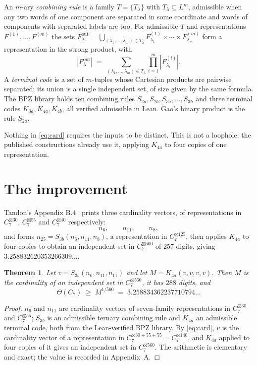 \documentclass[11pt]{article}
\newtheorem{theorem}{Theorem}
\theoremstyle{definition}
\begin{document}
An $m$-ary \emph{combining rule} is a family $T = \{T_\lambda\}$ with $T_\lambda \subseteq L^m$,
admissible when any two words of one component are separated in some coordinate and words of
components with separated labels are too. For admissible $T$ and representations
$F^{(1)}, \ldots, F^{(m)}$ the sets
$F^{\mathrm{out}}_\lambda = \bigcup_{(\lambda_1,\ldots,\lambda_m) \in T_\lambda}
 F^{(1)}_{\lambda_1} \times \cdots \times F^{(m)}_{\lambda_m}$
form a representation in the strong product, with
\begin{equation}\label{eq:card}
  |F^{\mathrm{out}}_\lambda| \;=\; \sum_{(\lambda_1,\ldots,\lambda_m) \in T_\lambda}
  \prod_{i=1}^m |F^{(i)}_{\lambda_i}|.
\end{equation}
A \emph{terminal code} is a set of $m$-tuples whose Cartesian products are pairwise separated; its
union is a single independent set, of size given by the same formula. The BPZ library holds ten
combining rules $S_{2a}, S_{2b}, S_{3a}, \ldots, S_{3h}$ and three terminal codes
$K_{3a}, K_{4a}, K_{4b}$, all verified admissible in Lean. Gao's binary product is the rule
$S_{2a}$.

Nothing in \eqref{eq:card} requires the inputs to be distinct. This is not a loophole: the
published constructions already use it, applying $K_{4a}$ to four copies of one representation.

\section{The improvement}

Tandon's Appendix B.4~\cite{Tandon} prints three cardinality vectors, of representations in
$C_7^{\boxtimes 30}$, $C_7^{\boxtimes 55}$ and $C_7^{\boxtimes 40}$ respectively:
\[
  n_6, \qquad n_{11}, \qquad n_8,
\]
and forms $n_{25} = S_{3b}(n_6, n_{11}, n_8)$, a representation in $C_7^{\boxtimes 125}$, then
applies $K_{4a}$ to four copies to obtain an independent set in $C_7^{\boxtimes 500}$ of $257$
digits, giving $3.258832620353266309\ldots$.

\begin{theorem}\label{thm:main}
Let $v = S_{3b}(n_6, n_{11}, n_{11})$ and let $M = K_{4a}(v,v,v,v)$. Then $M$ is the cardinality
of an independent set in $C_7^{\boxtimes 560}$, it has $288$ digits, and
\[
  \Theta(C_7) \;\ge\; M^{1/560} \;=\; 3.258834362237710794\ldots
\]
\end{theorem}

\begin{proof}
$n_6$ and $n_{11}$ are cardinality vectors of seven-family representations in
$C_7^{\boxtimes 30}$ and $C_7^{\boxtimes 55}$; $S_{3b}$ is an admissible ternary combining rule
and $K_{4a}$ an admissible terminal code, both from the Lean-verified BPZ library. By
\eqref{eq:card}, $v$ is the cardinality vector of a representation in
$C_7^{\boxtimes 30+55+55} = C_7^{\boxtimes 140}$, and $K_{4a}$ applied to four copies of it gives
an independent set in $C_7^{\boxtimes 560}$. The arithmetic is elementary and exact; the value is
recorded in Appendix~A.
\end{proof}
\end{document}
